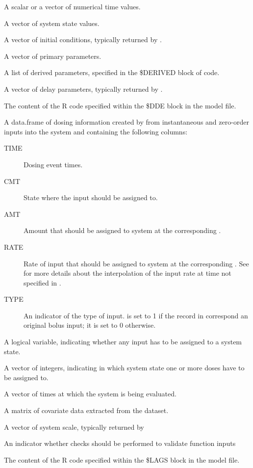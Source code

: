 \begin{Arguments}
\begin{ldescription}
\item[\code{t}] A scalar or a vector of numerical time values.
\item[\code{y}] A vector of system state values.
\item[\code{ic}] A vector of initial conditions, typically returned by 
.
\item[\code{parms}] A vector of primary parameters.
\item[\code{derparms}] A list of derived parameters, specified in the \$DERIVED block
of code.
\item[\code{delags}] A vector of delay parameters, typically returned by 
.
\item[\code{codedde}] The content of the R code specified within the \$DDE block in 
the model file.
\item[\code{dosing}] A data.frame of dosing information created by 
from instantaneous and zero-order inputs into the system and containing the 
following columns: \begin{description}

\item[TIME] Dosing event times.
\item[CMT] State where the input should be assigned to.
\item[AMT] Amount that should be assigned to system  at the
corresponding .
\item[RATE] Rate of input that should be assigned to system  at 
the corresponding . See 
 for more details about
the interpolation of the input rate at time not specified in
.
\item[TYPE] An indicator of the type of input.  is set to 1 if
the record in  correspond an original bolus input; it is 
set to 0 otherwise.

\end{description}


\item[\code{has.dosing}] A logical variable, indicating whether any input has to
be assigned to a system state.
\item[\code{dose.states}] A vector of integers, indicating in which system state one
or more doses have to be assigned to.
\item[\code{xdata}] A vector of times at which the system is being evaluated.
\item[\code{covdata}] A matrix of covariate data extracted from the dataset.
\item[\code{scale}] A vector of system scale, typically returned by 
\item[\code{check}] An indicator whether checks should be performed to validate 
function inputs
\item[\code{codelags}] The content of the R code specified within the \$LAGS block in
the model file.
\end{ldescription}
\end{Arguments}
